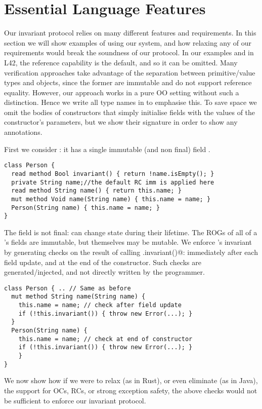 \section{Essential Language Features}
\label{s:immutable}
Our invariant protocol relies on many different features and requirements. In this section 
we will show examples of using our system, and how relaxing any of our requirements would break the soundness of our protocol.
In our examples and in L42, the reference capability \Q@imm@ is the default, and so it can be omitted.
Many verification approaches take advantage of the separation between primitive/value types and objects, since the former are immutable and do not support reference equality.
However, our approach works in a pure OO setting without such a distinction. Hence we write all type names in \Q@BoldTitleCase@ to emphasise this. 
To save space we omit the bodies of constructors that simply initialise fields with the values of the constructor's parameters, but we show their signature in order to show any annotations.

First we consider
\Q@Person@: it has a single immutable (and non final) field \Q@name@.
\begin{lstlisting}
class Person {
  read method Bool invariant() { return !name.isEmpty(); }
  private String name;//the default RC imm is applied here
  read method String name() { return this.name; }
  mut method Void name(String name) { this.name = name; }
  Person(String name) { this.name = name; }
}
\end{lstlisting}
The \Q@name@ field is not final: \Q@Person@s can change state during their lifetime. The ROGs of all of a \Q@Person@'s fields are immutable, but \Q@Person@s themselves may be mutable.
We enforce \Q@Person@'s invariant by generating checks on the result of calling \Q@this.invariant()@: immediately after each field update, and at the end of the constructor.
Such checks are generated/injected, and not directly written by the programmer.
\begin{lstlisting}
class Person { .. // Same as before
  mut method String name(String name) {
    this.name = name; // check after field update
    if (!this.invariant()) { throw new Error(...); }
  }
  Person(String name) {
    this.name = name; // check at end of constructor
    if (!this.invariant()) { throw new Error(...); }
    }
}
\end{lstlisting}
We now show how if we were to relax (as in Rust), or even eliminate (as in Java), the support for OCs, RCs, or strong exception safety, the above checks would not be sufficient to enforce our invariant protocol.

